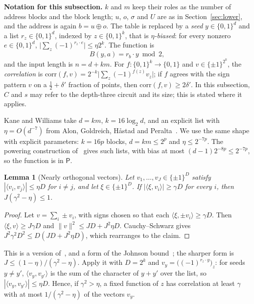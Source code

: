 \documentclass[11pt,letterpaper]{article}
\newtheorem{lemma}[theorem]{Lemma}
\theoremstyle{remark}
\newcommand{\bits}{\{0,1\}}
\begin{document}
\begin{keybox}
\textbf{Notation for this subsection.} $k$ and $m$ keep their roles as the
number of address blocks and the block length; $u$, $o$, $\sigma$ and $U$
are as in Section~\ref{sec:lower}, and the address is again $b=u\oplus o$.
The table is replaced by a \emph{seed} $y\in\bits^d$ and a list
$r_z\in\bits^d$, indexed by $z\in\bits^k$, that is \emph{$\eta$-biased}: for
every nonzero $e\in\bits^d$, $\bigl|\sum_z(-1)^{r_z\cdot e}\bigr|\le\eta2^k$.
The function is
\[
B(y,a)=r_b\cdot y\bmod2 ,
\]
and the input length is $n=d+km$. For $f:\bits^k\to\bits$ and
$v\in\{\pm1\}^{2^k}$, the \emph{correlation} is
$\mathrm{corr}(f,v)=2^{-k}\bigl|\sum_z(-1)^{f(z)}v_z\bigr|$; if $f$ agrees with
the sign pattern $v$ on a $\tfrac12+\delta'$ fraction of points, then
$\mathrm{corr}(f,v)\ge2\delta'$. In this subsection, $C$ and $s$ may refer to
the depth-three circuit and its size; this is stated where it applies.
\end{keybox}

Kane and Williams take $d=km$, $k=16\log_2d$, and an explicit list with
$\eta=O(d^{-7})$ from Alon, Goldreich, H{\aa}stad and Peralta~\cite{AGHP}. We
use the same shape with explicit parameters: $k=16p$ blocks, $d=km\le2^p$ and
$\eta\le2^{-7p}$. The powering construction of~\cite{AGHP} gives such lists,
with bias at most $(d-1)2^{-8p}\le2^{-7p}$, so the function is in $\mathsf P$.

\begin{lemma}[Nearly orthogonal vectors]\label{lem:gram}
Let $v_1,\dots,v_J\in\{\pm1\}^D$ satisfy $|\langle v_i,v_j\rangle|\le\eta D$
for $i\ne j$, and let $\xi\in\{\pm1\}^D$. If $|\langle\xi,v_i\rangle|\ge\gamma D$
for every $i$, then $J(\gamma^2-\eta)\le1$.
\end{lemma}
\begin{proof}
Let $v=\sum_i\pm v_i$, with signs chosen so that each
$\langle\xi,\pm v_i\rangle\ge\gamma D$. Then $\langle\xi,v\rangle\ge J\gamma D$
and $\|v\|^2\le JD+J^2\eta D$. Cauchy--Schwarz gives
$J^2\gamma^2D^2\le D(JD+J^2\eta D)$, which rearranges to the claim.
\end{proof}
This is a version of~\cite[Lemma~6.1]{KW}, and a form of the Johnson
bound~\cite[Ch.~3]{Gur}; the sharper form is $J\le(1-\eta)/(\gamma^2-\eta)$.
Apply it with $D=2^k$ and $v_y=\bigl((-1)^{r_z\cdot y}\bigr)_z$: for seeds
$y\ne y'$, $\langle v_y,v_{y'}\rangle$ is the sum of the character of $y+y'$
over the list, so $|\langle v_y,v_{y'}\rangle|\le\eta D$. Hence, if
$\gamma^2>\eta$, a fixed function of $z$ has correlation at least $\gamma$
with at most $1/(\gamma^2-\eta)$ of the vectors $v_y$.
\end{document}
